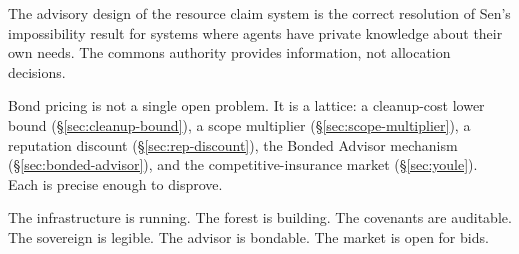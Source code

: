 \documentclass[11pt,a4paper]{article}
\theoremstyle{definition}
\theoremstyle{remark}
\begin{document}
The advisory design of the resource claim system is the correct resolution of Sen's impossibility result for systems where agents have private knowledge about their own needs. The commons authority provides information, not allocation decisions.

Bond pricing is not a single open problem. It is a lattice: a cleanup-cost lower bound (\S\ref{sec:cleanup-bound}), a scope multiplier (\S\ref{sec:scope-multiplier}), a reputation discount (\S\ref{sec:rep-discount}), the Bonded Advisor mechanism (\S\ref{sec:bonded-advisor}), and the competitive-insurance market (\S\ref{sec:youle}). Each is precise enough to disprove.

The infrastructure is running. The forest is building. The covenants are auditable. The sovereign is legible. The advisor is bondable. The market is open for bids.
\end{document}
